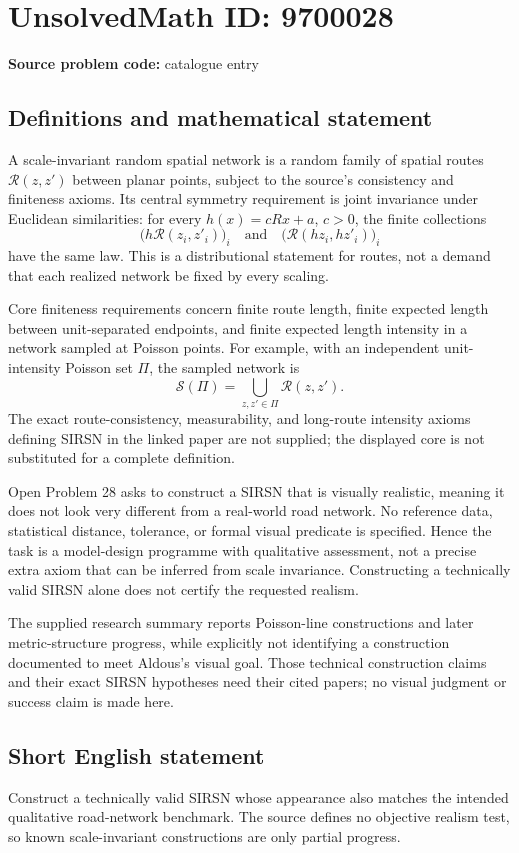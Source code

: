\documentclass[11pt]{article}
\begin{document}
\section*{UnsolvedMath ID: 9700028}
\textbf{Source problem code:} catalogue entry
\subsection{Definitions and mathematical statement}
A scale-invariant random spatial network is a random family of spatial routes \(\mathcal R(z,z')\) between planar points, subject to the source's consistency and finiteness axioms. Its central symmetry requirement is joint invariance under Euclidean similarities: for every \(h(x)=cRx+a\), \(c>0\), the finite collections
\[
\bigl(h\mathcal R(z_i,z'_i)\bigr)_i
\quad\text{and}\quad
\bigl(\mathcal R(hz_i,hz'_i)\bigr)_i
\]
have the same law. This is a distributional statement for routes, not a demand that each realized network be fixed by every scaling.

Core finiteness requirements concern finite route length, finite expected length between unit-separated endpoints, and finite expected length intensity in a network sampled at Poisson points. For example, with an independent unit-intensity Poisson set \(\Pi\), the sampled network is
\[
\mathcal S(\Pi)=\bigcup_{z,z'\in\Pi}\mathcal R(z,z').
\]
The exact route-consistency, measurability, and long-route intensity axioms defining SIRSN in the linked paper are not supplied; the displayed core is not substituted for a complete definition.

Open Problem 28 asks to construct a SIRSN that is visually realistic, meaning it does not look very different from a real-world road network. No reference data, statistical distance, tolerance, or formal visual predicate is specified. Hence the task is a model-design programme with qualitative assessment, not a precise extra axiom that can be inferred from scale invariance. Constructing a technically valid SIRSN alone does not certify the requested realism.

The supplied research summary reports Poisson-line constructions and later metric-structure progress, while explicitly not identifying a construction documented to meet Aldous's visual goal. Those technical construction claims and their exact SIRSN hypotheses need their cited papers; no visual judgment or success claim is made here.
\subsection{Short English statement}
Construct a technically valid SIRSN whose appearance also matches the intended qualitative road-network benchmark. The source defines no objective realism test, so known scale-invariant constructions are only partial progress.
\end{document}

